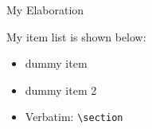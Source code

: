 \documentclass{article}
\begin{document}
\noindent My Elaboration

\begin{adjustbox}{minipage=0.85\textwidth,precode=\dbox}
	My item list is shown below:
	\begin{itemize}
		\item dummy item
		\item dummy item 2
		\item Verbatim: \verb+\section+
	\end{itemize}
\end{adjustbox}
\end{document}
